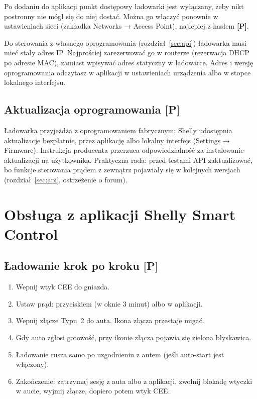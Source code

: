 \documentclass[11pt,a4paper]{article}
\newcommand{\tagP}{\textcolor{apgreen}{\textbf{[P]}}}
\begin{document}
Po dodaniu do aplikacji punkt dostępowy ładowarki jest wyłączany, żeby nikt postronny nie mógł się do niej dostać. Można go włączyć ponownie w ustawieniach sieci (zakładka Networks → Access Point), najlepiej z hasłem \tagP.

\begin{uwaga}
Do sterowania z własnego oprogramowania (rozdział~\ref{sec:api}) ładowarka musi mieć stały adres IP. Najprościej zarezerwować go w routerze (rezerwacja DHCP po adresie MAC), zamiast wpisywać adres statyczny w ładowarce. Adres i wersję oprogramowania odczytasz w aplikacji w ustawieniach urządzenia albo w stopce lokalnego interfejsu.
\end{uwaga}

\subsection{Aktualizacja oprogramowania \tagP}

Ładowarka przyjeżdża z oprogramowaniem fabrycznym; Shelly udostępnia aktualizacje bezpłatnie, przez aplikację albo lokalny interfejs (Settings → Firmware). Instrukcja producenta przerzuca odpowiedzialność za instalowanie aktualizacji na użytkownika. Praktyczna rada: przed testami API zaktualizować, bo funkcje sterowania prądem z zewnątrz pojawiały się w kolejnych wersjach (rozdział~\ref{sec:api}, ostrzeżenie o forum).

\section{Obsługa z aplikacji Shelly Smart Control}

\subsection{Ładowanie krok po kroku \tagP}

\begin{enumerate}
\item Wepnij wtyk CEE do gniazda.
\item Ustaw prąd: przyciskiem (w oknie 3 minut) albo w aplikacji.
\item Wepnij złącze Typu~2 do auta. Ikona złącza przestaje migać.
\item Gdy auto zgłosi gotowość, przy ikonie złącza pojawia się zielona błyskawica.
\item Ładowanie rusza samo po uzgodnieniu z autem (jeśli auto-start jest włączony).
\item Zakończenie: zatrzymaj sesję z auta albo z aplikacji, zwolnij blokadę wtyczki w aucie, wyjmij złącze, dopiero potem wtyk CEE.
\end{enumerate}
\end{document}
